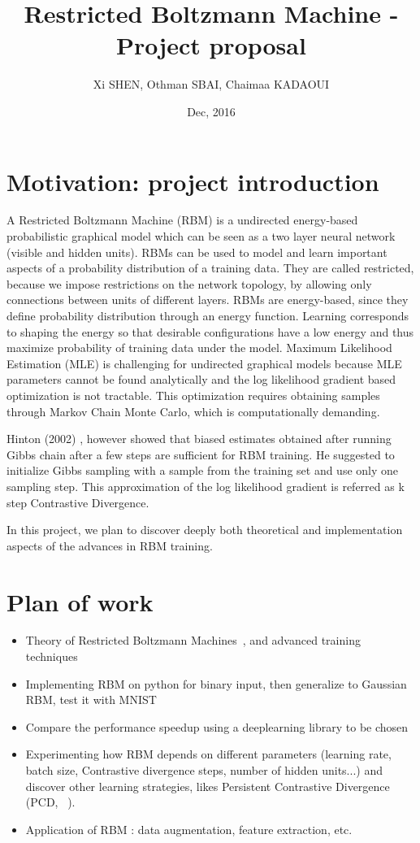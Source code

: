 \documentclass[a4paper,10pt]{article}
\author{Xi SHEN, Othman SBAI, Chaimaa KADAOUI}
\title{Restricted Boltzmann Machine - Project proposal}
\date{Dec, 2016}
\begin{document}
\maketitle
\section{Motivation: project introduction}
A Restricted Boltzmann Machine (RBM) is a undirected energy-based probabilistic graphical model which can be seen as a two layer neural network (visible and hidden units). RBMs can be used to model and learn important aspects of a probability distribution of a training data. They are called restricted, because we impose restrictions on the network topology, by allowing only connections between units of different layers. RBMs are energy-based, since they define probability distribution through an energy function. Learning corresponds to shaping the energy so that desirable configurations have a low energy and thus maximize probability of training data under the model. Maximum Likelihood Estimation (MLE) is challenging for undirected graphical models because MLE parameters cannot be found analytically and the log likelihood gradient based optimization is not tractable. This optimization requires obtaining samples through Markov Chain Monte Carlo, which is computationally demanding. 

Hinton (2002) \cite{praticalGuide}, however showed that biased estimates obtained after running Gibbs chain after a few steps are sufficient for RBM training. He suggested to initialize Gibbs sampling with a sample from the training set and use only one sampling step. This approximation of the log likelihood gradient is referred as k step Contrastive Divergence.

In this project, we plan to discover deeply both theoretical and implementation aspects of the advances in RBM training. 

\section{Plan of work}

\begin{itemize}
	\item Theory of Restricted Boltzmann Machines~\cite{these}, and advanced training techniques~\cite{praticalGuide}
	\item Implementing RBM on python for binary input, then generalize to Gaussian RBM, test it with MNIST~\cite{mnist}
	\item Compare the performance speedup using a deeplearning library to be chosen
	\item Experimenting how RBM depends on different parameters (learning rate, batch size, Contrastive divergence steps, number of hidden units...) and discover other learning strategies, likes Persistent Contrastive Divergence (PCD, ~\cite{pcd}).
	\item Application of RBM : data augmentation, feature extraction, etc.
\end{itemize}
\end{document}

